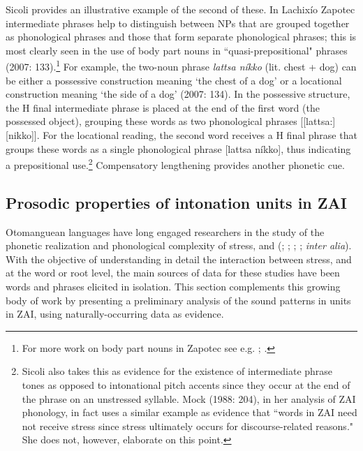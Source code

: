 Sicoli provides an illustrative example of the second of these. In Lachix\'{i}o Zapotec intermediate phrases help to distinguish between NPs that are grouped together as phonological phrases and those that form separate phonological phrases; this is most clearly seen in the use of body part nouns in ``quasi-prepositional" phrases (2007: 133).\footnote{For more work on body part nouns in Zapotec see e.g. \citet{maclaury1989}; \citet{lillehaugen2006}.} For example, the two-noun phrase \textit{lattsa n\'{i}kko} (lit. chest + dog) can be either a possessive construction meaning `the chest of a dog' or a locational construction meaning `the side of a dog' (2007: 134). In the possessive structure, the H final intermediate phrase  is placed at the end of the first word (the possessed object), grouping these words as two phonological phrases [[lattsa:][nikko]]. For the locational reading, the second word receives a H final phrase  that groups these words as a single phonological phrase [lattsa n\'{i}kko], thus indicating a prepositional use.\footnote{Sicoli also takes this as evidence for the existence of intermediate phrase tones as opposed to intonational pitch accents since they occur at the end of the phrase on an unstressed syllable. Mock (1988: 204), in her analysis of ZAI phonology, in fact uses a similar example as evidence that ``words in ZAI need not receive stress since stress ultimately occurs for discourse-related reasons." She does not, however, elaborate on this point.} Compensatory lengthening provides another phonetic cue. 


\subsection{Prosodic properties of intonation units in ZAI}\label{stressrule}

Otomanguean languages have long engaged researchers in the study of the phonetic realization and phonological complexity of stress,  and  (\citealt{arellanes2009}; \citealt{avelino2004}; \citealt{chavezpeon2010}; \citealt{mock1988}; \textit{inter alia}). With the objective of understanding in detail the interaction between stress,  and  at the word or root level, the main sources of data for these studies have been words and phrases elicited in isolation. This section complements this growing body of work by presenting a preliminary analysis of the sound patterns in  units in ZAI, using naturally-occurring data as evidence.

